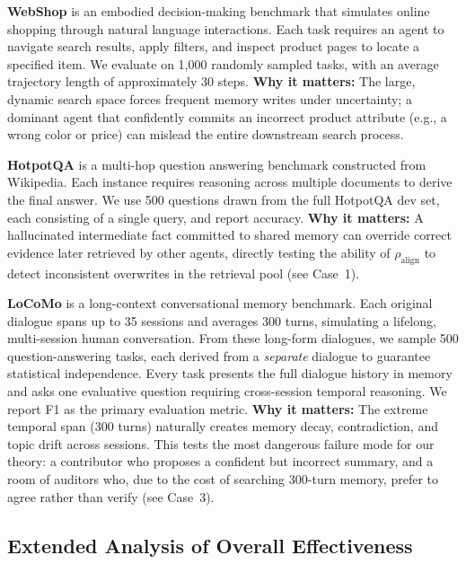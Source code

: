 \textbf{WebShop} is an embodied decision-making benchmark
that simulates online shopping through natural language
interactions. Each task requires an agent to navigate search
results, apply filters, and inspect product pages to locate a
specified item. We evaluate on 1,000 randomly sampled tasks, with
an average trajectory length of approximately 30 steps.
\textbf{Why it matters:} The large, dynamic search space forces
frequent memory writes under uncertainty; a dominant agent that
confidently commits an incorrect product attribute (e.g., a wrong
color or price) can mislead the entire downstream search process.

\textbf{HotpotQA} is a multi-hop question answering benchmark
constructed from Wikipedia. Each instance requires reasoning
across multiple documents to derive the final answer. We use 500
questions drawn from the full HotpotQA dev set, each consisting
of a single query, and report accuracy. \textbf{Why it matters:}
A hallucinated intermediate fact committed to shared memory can 
override correct evidence later retrieved by other agents, 
directly testing the ability of $\rho_{\text{align}}$ to detect 
inconsistent overwrites in the retrieval pool (see Case~1).

\textbf{LoCoMo} is a long-context conversational memory
benchmark. Each original dialogue spans up to 35 sessions and
averages 300 turns, simulating a lifelong, multi-session human
conversation. From these long-form dialogues, we sample 500 
question-answering tasks, each derived from a \emph{separate} 
dialogue to guarantee statistical independence. Every task 
presents the full dialogue history in memory and asks one 
evaluative question requiring cross-session temporal reasoning. 
We report F1 as the primary evaluation metric. \textbf{Why it 
matters:} The extreme temporal span (300 turns) naturally creates 
memory decay, contradiction, and topic drift across sessions.
This tests the most dangerous failure mode for our theory: a
contributor who proposes a confident but incorrect summary, and a
room of auditors who, due to the cost of searching 300-turn
memory, prefer to agree rather than verify (see Case~3).












\subsection{Extended Analysis of Overall Effectiveness}
\label{app:main_discussion}

